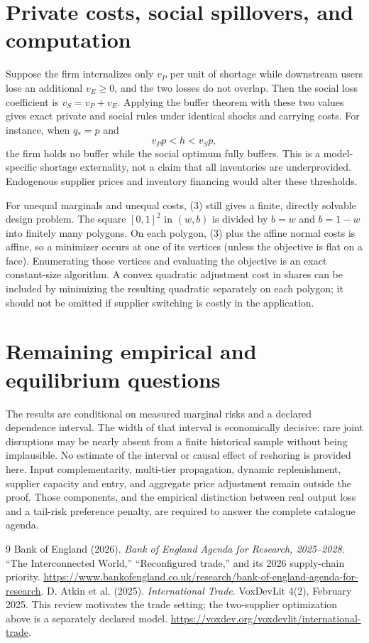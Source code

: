 \documentclass[11pt,a4paper]{article}
\theoremstyle{definition}
\theoremstyle{remark}
\begin{document}
\section{Private costs, social spillovers, and computation}
Suppose the firm internalizes only $v_P$ per unit of shortage while downstream users lose an additional $v_E\ge0$, and the two losses do not overlap. Then the social loss coefficient is $v_S=v_P+v_E$. Applying the buffer theorem with these two values gives exact private and social rules under identical shocks and carrying costs. For instance, when $q_*=p$ and
\[
 v_Pp<h<v_Sp,
\]
the firm holds no buffer while the social optimum fully buffers. This is a model-specific shortage externality, not a claim that all inventories are underprovided. Endogenous supplier prices and inventory financing would alter these thresholds.

For unequal marginals and unequal costs, (3) still gives a finite, directly solvable design problem. The square $[0,1]^2$ in $(w,b)$ is divided by $b=w$ and $b=1-w$ into finitely many polygons. On each polygon, (3) plus the affine normal costs is affine, so a minimizer occurs at one of its vertices (unless the objective is flat on a face). Enumerating those vertices and evaluating the objective is an exact constant-size algorithm. A convex quadratic adjustment cost in shares can be included by minimizing the resulting quadratic separately on each polygon; it should not be omitted if supplier switching is costly in the application.

\section{Remaining empirical and equilibrium questions}
The results are conditional on measured marginal risks and a declared dependence interval. The width of that interval is economically decisive: rare joint disruptions may be nearly absent from a finite historical sample without being implausible. No estimate of the interval or causal effect of reshoring is provided here. Input complementarity, multi-tier propagation, dynamic replenishment, supplier capacity and entry, and aggregate price adjustment remain outside the proof. Those components, and the empirical distinction between real output loss and a tail-risk preference penalty, are required to answer the complete catalogue agenda.
\begin{thebibliography}{9}
 Bank of England (2026).
\emph{Bank of England Agenda for Research, 2025--2028}.
``The Interconnected World,'' ``Reconfigured trade,'' and its 2026 supply-chain priority.
\url{https://www.bankofengland.co.uk/research/bank-of-england-agenda-for-research}.
 D. Atkin et al. (2025). \emph{International Trade}. VoxDevLit 4(2), February 2025. This review motivates the trade setting; the two-supplier optimization above is a separately declared model.
\url{https://voxdev.org/voxdevlit/international-trade}.
\end{thebibliography}
\end{document}
